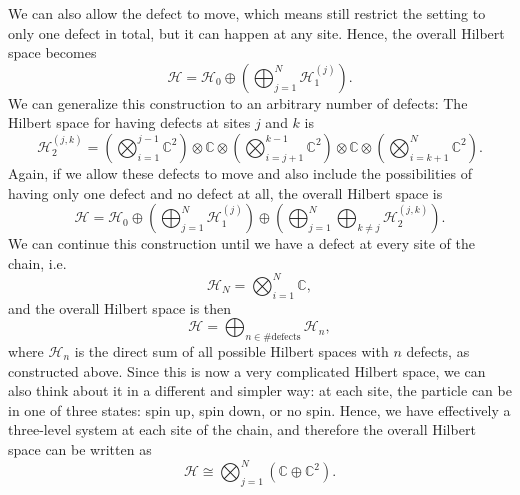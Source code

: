 We can also allow the defect to move, which means still restrict the setting to only one defect in total, but it can happen at any site. Hence, the overall Hilbert space becomes
	\begin{equation}
		\mathcal{H}=\mathcal{H}_0\oplus\left(\bigoplus_{j=1}^N\mathcal{H}_1^{(j)}\right).
	\end{equation}
We can generalize this construction to an arbitrary number of defects: The Hilbert space for having defects at sites $j$ and $k$ is 
	\begin{equation}
		\mathcal{H}_2^{(j,k)}=\left(\bigotimes_{i=1}^{j-1}\mathbb{C}^2\right)\otimes\mathbb{C}\otimes\left(\bigotimes_{i=j+1}^{k-1}\mathbb{C}^2\right)\otimes\mathbb{C}\otimes\left(\bigotimes_{i=k+1}^{N}\mathbb{C}^2\right).
	\end{equation}
Again, if we allow these defects to move and also include the possibilities of having only one defect and no defect at all, the overall Hilbert space is
	\begin{equation}
		\mathcal{H}=\mathcal{H}_0\oplus\left(\bigoplus_{j=1}^N\mathcal{H}_1^{(j)}\right)\oplus\left(\bigoplus_{j=1}^N\bigoplus_{k\neq j}\mathcal{H}_2^{(j,k)}\right).
	\end{equation}
We can continue this construction until we have a defect at every site of the chain, i.e.
	\begin{equation}
		\mathcal{H}_N=\bigotimes_{i=1}^N\mathbb{C},
	\end{equation}
and the overall Hilbert space is then
	\begin{equation}
		\mathcal{H}=\bigoplus_{n\in\#\mathrm{defects}}\mathcal{H}_n,
	\end{equation}
where $\mathcal{H}_n$ is the direct sum of all possible Hilbert spaces with $n$ defects, as constructed above. Since this is now a very complicated Hilbert space, we can also think about it in a different and simpler way: at each site, the particle can be in one of three states: spin up, spin down, or no spin. Hence, we have effectively a three-level system at each site of the chain, and therefore the overall Hilbert space can be written as
	\begin{equation}
		\mathcal{H}\cong\bigotimes_{j=1}^N\left(\mathbb{C}\oplus\mathbb{C}^2\right).
	\end{equation}

